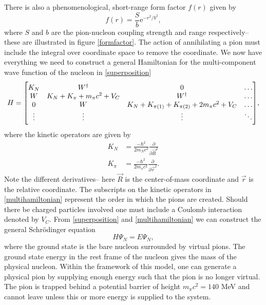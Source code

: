 There is also a phenomenological, short-range form factor $f(r)$ given by
\begin{equation}\label{formfactoreq}
	f(r) = \frac{S}{b} \text{e}^{-r^2/b^2},
\end{equation}
where $S$ and $b$ are the pion-nucleon coupling strength and range respectively--these are illustrated in figure \ref{formfactor}. The action of annihilating a pion must include the integral over coordinate space to remove the coordinate. We now have everything we need to construct a general Hamiltonian for the multi-component wave function of the nucleon in \eqref{superposition}
\begin{equation} \label{multihamiltonian}
	H = \mqty[K_N & W^\dagger & 0 &\ldots \\
	W & K_N+K_\pi+m_\pi c^2+V_C & W^\dagger & \ldots \\
	0 & W & K_N+K_{\pi(1)}+K_{\pi(2)}+2m_\pi c^2 +V_C & \ldots \\
	\vdots & \vdots & \vdots &\ddots ],
\end{equation}
where the kinetic operators are given by
\begin{align} \label{multiN}
	K_N &= \frac{-\hbar^2}{2 m_N c^2} \frac{\partial}{\partial \vec{R}^2} \\
	K_\pi &= \frac{-\hbar^2}{2 m_\pi c^2} \frac{\partial}{\partial \vec{r}^2}.
\end{align} 
Note the different derivatives-- here $\vec{R}$ is the center-of-mass coordinate and $\vec{r}$ is the relative coordinate. The subscripts on the kinetic operators in \eqref{multihamiltonian} represent the order in which the pions are created. Should there be charged particles involved one must include a Coulomb interaction denoted by $V_C$. From \eqref{superposition} and \eqref{multihamiltonian} we can construct the general Schrödinger equation
\begin{equation} \label{MultiSE}
	H \Psi_N = E \Psi_N,
\end{equation}
where the ground state is the bare nucleon surrounded by virtual pions. The ground state energy in the rest frame of the nucleon gives the mass of the physical nucleon. Within the framework of this model, one can generate a physical pion by supplying enough energy such that the pion is no longer virtual. The pion is trapped behind a potential barrier of height $m_\pi c^2 = 140$ MeV and cannot leave unless this or more energy is supplied to the system.  
